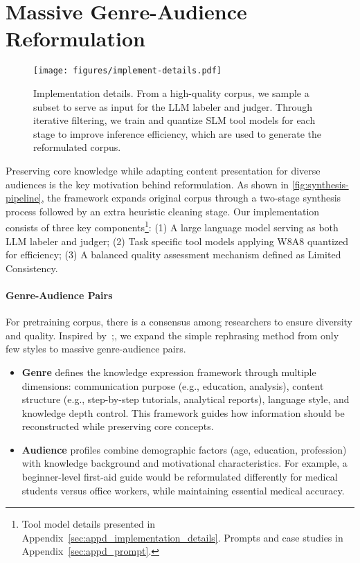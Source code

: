 \section{Massive Genre-Audience Reformulation}
\label{sec:syntheses_pipeline}
\label{sec:implementation_details}

\begin{figure}[t]
    \centering
    \vspace{-4em}
    \texttt{[image: figures/implement-details.pdf]}
    \vspace{-3em}
    \caption[width=0.8\columnwidth]{Implementation details. From a high-quality corpus, we sample a subset to serve as input for the LLM labeler and judger. 
    Through iterative filtering, we train and quantize SLM tool models for each stage to improve inference efficiency,
    which are used to generate the reformulated corpus.}
    \label{fig:synthesis-pipeline}
\end{figure}

Preserving core knowledge while adapting content presentation for diverse audiences is the key motivation behind {\ours} reformulation. 
As shown in \autoref{fig:synthesis-pipeline}, the framework expands original corpus through a two-stage synthesis process followed by an extra heuristic cleaning stage.
Our implementation consists of three key components\footnote{Tool model details presented in Appendix~\ref{sec:appd_implementation_details}. Prompts and case studies in Appendix~\ref{sec:appd_prompt}.}:
(1) A large language model serving as both LLM labeler and judger;
(2) Task specific tool models applying W8A8 quantized~\citep{xiao2023smoothquant} for efficiency;
(3) A balanced quality assessment mechanism defined as Limited Consistency.

\paragraph{Genre-Audience Pairs}
For pretraining corpus, there is a consensus among researchers to ensure diversity and quality.
Inspired by~\cite{maini2024rephrasing};\cite{ge2024scalingpersonas}, we expand the simple rephrasing method from only few styles to massive genre-audience pairs. 

\begin{itemize}[leftmargin=1.5em]
\item \textbf{Genre} defines the knowledge expression framework through multiple dimensions: communication purpose (e.g., education, analysis), content structure (e.g., step-by-step tutorials, analytical reports), language style, and knowledge depth control. This framework guides how information should be reconstructed while preserving core concepts.
\item \textbf{Audience} profiles combine demographic factors (age, education, profession) with knowledge background and motivational characteristics. For example, a beginner-level first-aid guide would be reformulated differently for medical students versus office workers, while maintaining essential medical accuracy.
\end{itemize}

